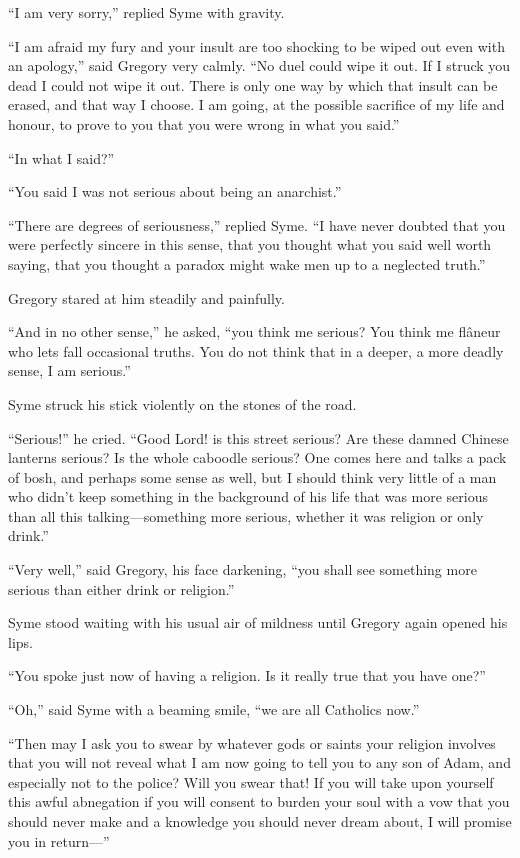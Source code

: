 “I am very sorry,” replied Syme with gravity.

“I am afraid my fury and your insult are too shocking to be wiped out even with an apology,” said Gregory very calmly. “No duel could wipe it out. If I struck you dead I could not wipe it out. There is only one way by which that insult can be erased, and that way I choose. I am going, at the possible sacrifice of my life and honour, to prove to you that you were wrong in what you said.”

“In what I said?”

“You said I was not serious about being an anarchist.”

“There are degrees of seriousness,” replied Syme. “I have never doubted that you were perfectly sincere in this sense, that you thought what you said well worth saying, that you thought a paradox might wake men up to a neglected truth.”

Gregory stared at him steadily and painfully.

“And in no other sense,” he asked, “you think me serious? You think me flâneur who lets fall occasional truths. You do not think that in a deeper, a more deadly sense, I am serious.”

Syme struck his stick violently on the stones of the road.

“Serious!” he cried. “Good Lord! is this street serious? Are these damned Chinese lanterns serious? Is the whole caboodle serious? One comes here and talks a pack of bosh, and perhaps some sense as well, but I should think very little of a man who didn’t keep something in the background of his life that was more serious than all this talking⁠—something more serious, whether it was religion or only drink.”

“Very well,” said Gregory, his face darkening, “you shall see something more serious than either drink or religion.”

Syme stood waiting with his usual air of mildness until Gregory again opened his lips.

“You spoke just now of having a religion. Is it really true that you have one?”

“Oh,” said Syme with a beaming smile, “we are all Catholics now.”

“Then may I ask you to swear by whatever gods or saints your religion involves that you will not reveal what I am now going to tell you to any son of Adam, and especially not to the police? Will you swear that! If you will take upon yourself this awful abnegation if you will consent to burden your soul with a vow that you should never make and a knowledge you should never dream about, I will promise you in return⁠—”

